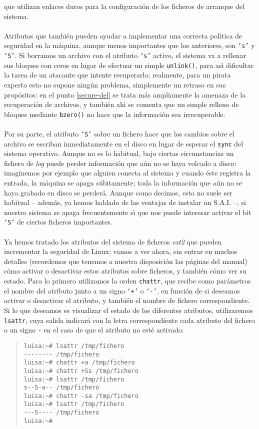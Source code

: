 que utilizan enlaces duros para la configuraci\'on de los ficheros de
arranque del sistema.\\
\\Atributos que tambi\'en pueden ayudar a implementar una correcta pol\'{\i}tica
de seguridad en la m\'aquina, aunque menos importantes que los anteriores, son
{\tt `s'} y {\tt `S'}. Si borramos un archivo con el atributo {\tt `s'} activo,
el sistema va a rellenar sus bloques con ceros en lugar de efectuar un simple
{\tt unlink()}, para as\'{\i} dificultar la tarea de un atacante que intente 
recuperarlo; realmente, para un pirata experto esto no supone ning\'un problema,
simplemente un retraso en sus prop\'ositos: en el punto \ref{secure-del} se
trata m\'as ampliamente la amenaza de la recuperaci\'on de archivos, y tambi\'en
ah\'{\i} se comenta que un simple relleno de bloques mediante {\tt bzero()} 
no hace que la informaci\'on sea irrecuperable.\\
\\Por su parte, el atributo {\tt `S'} sobre un fichero hace que los cambios 
sobre el archivo se escriban inmediatamente en el disco en lugar de esperar
el {\tt sync} del sistema operativo. Aunque no es lo habitual, bajo ciertas
circunstancias un fichero de {\it log} puede perder informaci\'on que a\'un
no se haya volcado a disco: imaginemos por ejemplo que alguien conecta al
sistema y cuando \'este registra la entrada, la m\'aquina se apaga
s\'ubitamente; toda la informaci\'on que a\'un no se haya grabado en disco se
perder\'a. Aunque como decimos, esto no suele ser habitual -- adem\'as, ya hemos
hablado de las ventajas de instalar un S.A.I. --, si nuestro sistema se apaga
frecuentemente s\'{\i} que nos puede interesar activar el bit {\tt `S'} de 
ciertos ficheros importantes.\\
\\Ya hemos tratado los atributos del sistema de ficheros {\it ext2} que pueden
incrementar la seguridad de Linux; vamos a ver ahora, sin entrar en muchos
detalles (recordemos que tenemos a nuestra disposici\'on las p\'aginas del
manual) c\'omo activar o desactivar estos atributos sobre ficheros, y tambi\'en
c\'omo ver su estado. Para lo primero utilizamos la orden {\tt chattr}, que
recibe como par\'ametros el nombre del atributo junto a un signo {\tt `+'} o 
{\tt `-'}, en funci\'on de si deseamos activar o desactivar el atributo, y
tambi\'en el nombre de fichero correspondiente. Si lo que deseamos es visualizar
el estado de los diferentes atributos, utilizaremos {\tt lsattr}, cuya salida
indicar\'a con la letra correspondiente cada atributo del fichero o un signo
{\tt -} en el caso de que el atributo no est\'e activado:
\begin{quote}
\begin{verbatim}
luisa:~# lsattr /tmp/fichero 
-------- /tmp/fichero
luisa:~# chattr +a /tmp/fichero 
luisa:~# chattr +Ss /tmp/fichero 
luisa:~# lsattr /tmp/fichero 
s--S-a-- /tmp/fichero
luisa:~# chattr -sa /tmp/fichero 
luisa:~# lsattr /tmp/fichero 
---S---- /tmp/fichero
luisa:~# 
\end{verbatim}
\end{quote}
